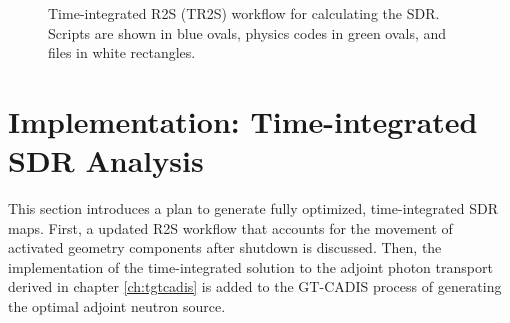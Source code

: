 \begin{figure}

	\caption[Time-integrated R2S (TR2S) workflow]
	{Time-integrated R2S (TR2S) workflow for calculating the SDR.
	Scripts are shown in
	blue ovals, physics codes in green ovals, and files in white
	rectangles.}
\end{figure}

\section{Implementation: Time-integrated SDR Analysis}\label{sec:implementation}

This section introduces a plan to generate fully optimized, time-integrated
SDR maps. First, a updated R2S workflow that accounts for the movement of
activated geometry components after shutdown is discussed.  Then, the implementation
of the time-integrated solution to the adjoint photon transport derived in
chapter \ref{ch:tgtcadis} is added to the GT-CADIS process of generating the
optimal adjoint neutron source. 


